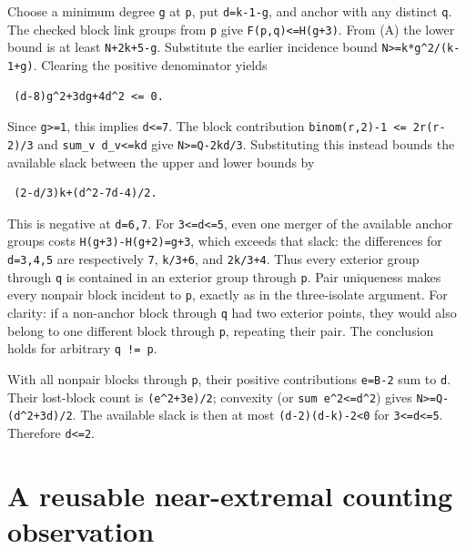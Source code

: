 \documentclass[11pt,letterpaper]{article}
\begin{document}
Choose a minimum degree \texttt{g} at \texttt{p}, put \texttt{d=k-1-g},
and anchor with any distinct \texttt{q}. The checked block link groups
from \texttt{p} give
\texttt{\textbar{}F(p,q)\textbar{}\textless{}=H(g+3)}. From (A) the
lower bound is at least \texttt{N+2k+5-g}. Substitute the earlier
incidence bound \texttt{N\textgreater{}=k*g\^{}2/(k-1+g)}. Clearing the
positive denominator yields

\begin{verbatim}
 (d-8)g^2+3dg+4d^2 <= 0.
\end{verbatim}

Since \texttt{g\textgreater{}=1}, this implies \texttt{d\textless{}=7}.
The block contribution \texttt{binom(r,2)-1\ \textless{}=\ 2r(r-2)/3}
and \texttt{sum\_v\ d\_v\textless{}=kd} give
\texttt{N\textgreater{}=Q-2kd/3}. Substituting this instead bounds the
available slack between the upper and lower bounds by

\begin{verbatim}
 (2-d/3)k+(d^2-7d-4)/2.
\end{verbatim}

This is negative at \texttt{d=6,7}. For
\texttt{3\textless{}=d\textless{}=5}, even one merger of the available
anchor groups costs \texttt{H(g+3)-H(g+2)=g+3}, which exceeds that
slack: the differences for \texttt{d=3,4,5} are respectively \texttt{7},
\texttt{k/3+6}, and \texttt{2k/3+4}. Thus every exterior group through
\texttt{q} is contained in an exterior group through \texttt{p}. Pair
uniqueness makes every nonpair block incident to \texttt{p}, exactly as
in the three-isolate argument. For clarity: if a non-anchor block
through \texttt{q} had two exterior points, they would also belong to
one different block through \texttt{p}, repeating their pair. The
conclusion holds for arbitrary \texttt{q\ !=\ p}.

With all nonpair blocks through \texttt{p}, their positive contributions
\texttt{e=\textbar{}B\textbar{}-2} sum to \texttt{d}. Their lost-block
count is \texttt{(e\^{}2+3e)/2}; convexity (or
\texttt{sum\ e\^{}2\textless{}=d\^{}2}) gives
\texttt{N\textgreater{}=Q-(d\^{}2+3d)/2}. The available slack is then at
most \texttt{(d-2)(d-k)-2\textless{}0} for
\texttt{3\textless{}=d\textless{}=5}. Therefore \texttt{d\textless{}=2}.

\section{A reusable near-extremal counting
observation}\label{2-a-reusable-near-extremal-counting-observation}
\end{document}
